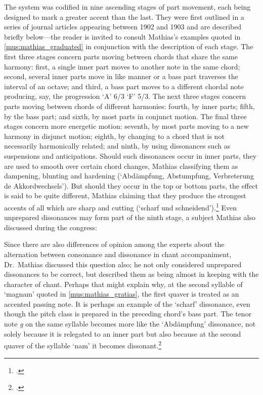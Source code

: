 The system was codified in nine ascending stages of part movement, each being designed to mark a greater accent than the last.
They were first outlined in a series of journal articles appearing between 1902 and 1903 and are described briefly below---the reader is invited to consult Mathias's examples quoted in \cref{mus:mathias_graduated} in conjunction with the description of each stage.
The first three stages concern parts moving between chords that share the same harmony: first, a single inner part moves to another note in the same chord; second, several inner parts move in like manner or a bass part traverses the interval of an octave; and third, a bass part moves to a different chordal note producing, say, the progression `A' 6/3 \rightarrow{} `F' 5/3.
The next three stages concern parts moving between chords of different harmonies: fourth, by inner parts; fifth, by the bass part; and sixth, by most parts in conjunct motion.
The final three stages concern more energetic motion: seventh, by most parts moving to a new harmony in disjunct motion; eighth, by changing to a chord that is not necessarily harmonically related; and ninth, by using dissonances such as suspensions and anticipations.
Should such dissonances occur in inner parts, they are used to smooth over certain chord changes, Mathias classifying them as dampening, blunting and hardening (`Abdämpfung, Abstumpfung, Verbreterung de Akkordwechsels').
But should they occur in the top or bottom parts, the effect is said to be quite different, Mathias claiming that they produce the strongest accents of all which are sharp and cutting (`scharf und schneidend').\footnote{\cites[62--4]{MathiasChoralbegleitung1903}[39--41]{MathiasChoralbegleitung1905}.\label{fn:mathias_choralbegleitung}}
Even unprepared dissonances may form part of the ninth stage, a subject Mathias also discussed during the congress:

  {\cite[170]{H[orn]internationaleKongressfuer1905}}
{Since there are also differences of opinion among the experts about the alternation between consonance and dissonance in chant accompaniment, Dr.\ Mathias discussed this question also; he not only considered unprepared dissonances to be correct, but described them as being almost in keeping with the character of chant.}
\noindent
Perhaps that might explain why, at the second syllable of `magnam' quoted in \cref{mus:mathias_gratias}, the first quaver is treated as an accented passing note.
It is perhaps an example of the `scharf' dissonance, even though the pitch class is prepared in the preceding chord's bass part.
The tenor note \emph{g} on the same syllable becomes more like the `Abdämpfung' dissonance, not solely because it is relegated to an inner part but also because at the second quaver of the syllable `nam' it becomes dissonant.\footnote{\covid{}\cite[16]{MathiasOrgelbegleitunggebraeuchlichstenMess1903}.}
\nowidow[2]

